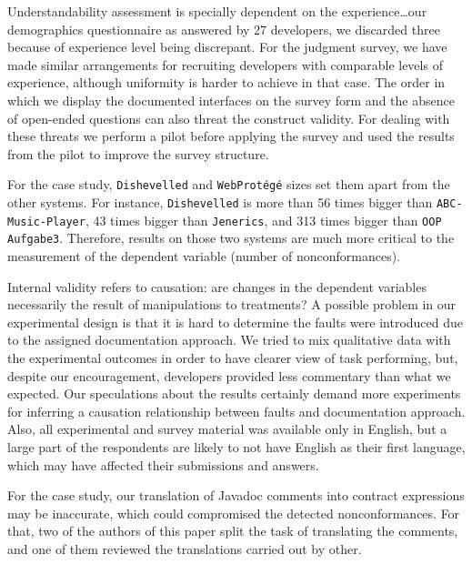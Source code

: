 Understandability assessment is specially dependent on the experience…our demographics questionnaire as answered by 27 developers, we discarded three because of experience level being discrepant.
For the judgment survey, we have made similar arrangements for recruiting developers with comparable levels of experience, although uniformity is harder to achieve in that case.
The order in which we display the documented
interfaces on the survey form and the absence of open-ended questions can also threat the construct validity. For dealing with these threats we
perform a pilot before applying the survey and used the results from the pilot to improve the survey structure. 


For the case study, \texttt{Dishevelled} and
\texttt{WebProt\'{e}g\'{e}} sizes set them apart from the other systems.
For instance, \texttt{Dishevelled} is more than 56 times bigger than \texttt{ABC-Music-Player}, 43
times bigger than \texttt{Jenerics}, and 313 times bigger than \texttt{OOP Aufgabe3}.
Therefore, results on those two systems are much more critical to the measurement of the dependent variable (number of nonconformances).


Internal validity refers to causation: are changes in the dependent variables necessarily the result of manipulations to treatments? A possible problem in our experimental design is that it is hard to determine the faults were introduced due to the assigned documentation approach. We tried to mix qualitative data with the experimental outcomes in order to have clearer view of task performing, but, despite our encouragement, developers provided less commentary than what we expected. Our speculations about the results certainly demand more experiments for inferring a causation relationship between faults and documentation approach.
Also, all experimental and survey material was available only in English, but a large part of the respondents are likely to not have English as their first language, which may have affected their
submissions and answers.

For the case study, our translation of Javadoc comments into contract expressions may be inaccurate, which could compromised the detected nonconformances. For that, two of the authors of this paper split the task of translating the comments, and one of them reviewed the translations carried out by other. 



